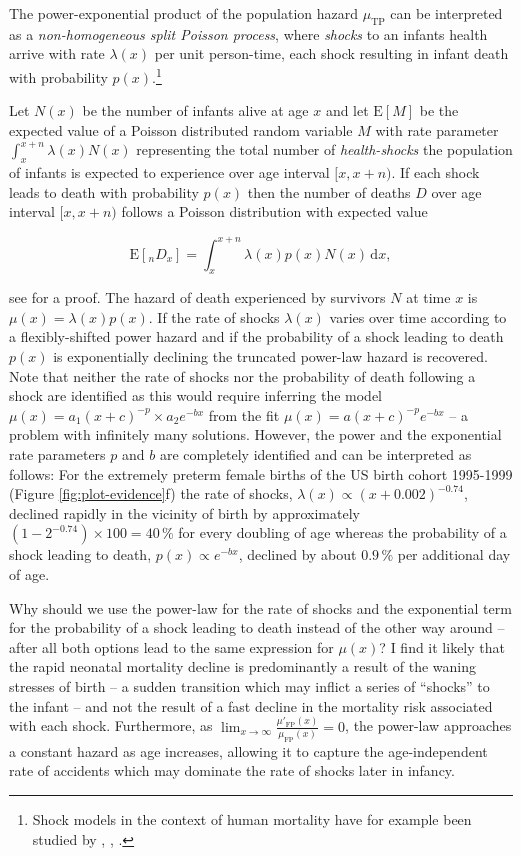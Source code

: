 \documentclass[10pt, twoside, parskip=half]{article}
\begin{document}
The power-exponential product of the population hazard \(\mu_\text{TP}\)
can be interpreted as a \emph{non-homogeneous split Poisson process},
where \emph{shocks} to an infants health arrive with rate \(\lambda(x)\)
per unit person-time, each shock resulting in infant death with
probability \(p(x)\).\footnote{Shock models in the context of human
  mortality have for example been studied by \citet{Strehler1960},
  \citet{Finkelstein2005}, \citet{Cha2016}.}

Let \(N(x)\) be the number of infants alive at age \(x\) and let
\(\text{E}{[M]}\) be the expected value of a Poisson distributed random
variable \(M\) with rate parameter \(\int_x^{x+n}\lambda(x)N(x)\)
representing the total number of \emph{health-shocks} the population of
infants is expected to experience over age interval \([x, x+n)\). If
each shock leads to death with probability \(p(x)\) then the number of
deaths \(D\) over age interval \([x, x+n)\) follows a Poisson
distribution with expected value

\[
\text{E}[{}_{n}D_x]=\int_x^{x+n}\lambda(x)p(x)N(x)\,\text{d}x,
\]

see \citet{Prekopa1958} for a proof. The hazard of death experienced by
survivors \(N\) at time \(x\) is \(\mu(x) = \lambda(x)p(x)\). If the
rate of shocks \(\lambda(x)\) varies over time according to a
flexibly-shifted power hazard and if the probability of a shock leading
to death \(p(x)\) is exponentially declining the truncated power-law
hazard is recovered. Note that neither the rate of shocks nor the
probability of death following a shock are identified as this would
require inferring the model \(\mu(x)=a_1(x+c)^{-p}\times a_2e^{-bx}\)
from the fit \(\mu(x)=a(x+c)^{-p}e^{-bx}\) -- a problem with infinitely
many solutions. However, the power and the exponential rate parameters
\(p\) and \(b\) are completely identified and can be interpreted as
follows: For the extremely preterm female births of the US birth cohort
1995-1999 (Figure \ref{fig:plot-evidence}f) the rate of shocks,
\(\lambda(x)\propto(x+0.002)^{-0.74}\), declined rapidly in the vicinity
of birth by approximately \((1-2^{-0.74})\times100=40\,\%\) for every
doubling of age whereas the probability of a shock leading to death,
\(p(x)\propto e^{-bx}\), declined by about \(0.9\,\%\) per additional
day of age.

Why should we use the power-law for the rate of shocks and the
exponential term for the probability of a shock leading to death instead
of the other way around -- after all both options lead to the same
expression for \(\mu(x)\)? I find it likely that the rapid neonatal
mortality decline is predominantly a result of the waning stresses of
birth -- a sudden transition which may inflict a series of ``shocks'' to
the infant -- and not the result of a fast decline in the mortality risk
associated with each shock. Furthermore, as
\(\lim_{x\to\infty}\frac{\mu'_\text{FP}(x)}{\mu_\text{FP}(x)}=0\), the
power-law approaches a constant hazard as age increases, allowing it to
capture the age-independent rate of accidents which may dominate the
rate of shocks later in infancy.
\end{document}
